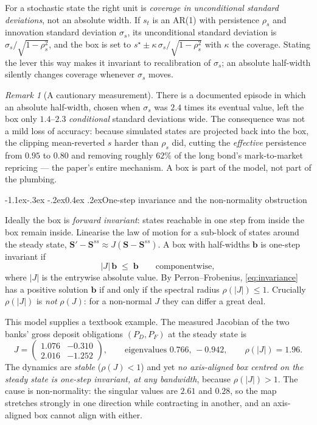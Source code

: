 \documentclass[10pt,a4paper]{article}
\makeatletter
\theoremstyle{definition}
\theoremstyle{plain}
\theoremstyle{remark}
\newtheorem{rem}[defn]{Remark}
\newcommand{\st}{\mathbf{S}}
\renewcommand\subsection{\@startsection{subsection}{2}{\z@}%
  {-1.1ex\@plus -.3ex \@minus -.2ex}{0.4ex \@plus .2ex}{\normalfont\normalsize\bfseries}}
\makeatother
\begin{document}
For a stochastic state the right unit is \emph{coverage in unconditional standard
deviations}, not an absolute width. If $s_t$ is an AR(1) with persistence $\rho_s$ and
innovation standard deviation $\sigma_s$, its unconditional standard deviation is
$\sigma_s/\sqrt{1-\rho_s^2}$, and the box is set to $s^\star \pm \kappa\,
\sigma_s/\sqrt{1-\rho_s^2}$ with $\kappa$ the coverage. Stating the lever this way makes it
invariant to recalibration of $\sigma_s$; an absolute half-width silently changes coverage
whenever $\sigma_s$ moves.

\begin{rem}[A cautionary measurement]
There is a documented episode in which an absolute half-width, chosen when $\sigma_s$ was
$2.4$ times its eventual value, left the box only $1.4$--$2.3$ \emph{conditional} standard
deviations wide. The consequence was not a mild loss of accuracy: because simulated states
are projected back into the box, the clipping mean-reverted $s$ harder than $\rho_s$ did,
cutting the \emph{effective} persistence from $0.95$ to $0.80$ and removing roughly $62\%$ of
the long bond's mark-to-market repricing --- the paper's entire mechanism. A box is part of
the model, not part of the plumbing.
\end{rem}

\subsection{One-step invariance and the non-normality obstruction}

Ideally the box is \emph{forward invariant}: states reachable in one step from inside the box
remain inside. Linearise the law of motion for a sub-block of states around the steady state,
$\st'-\st^{ss} \approx J(\st-\st^{ss})$. A box with half-widths $\bm{b}$ is one-step invariant
if
\begin{equation}
  |J|\,\bm{b} \;\le\; \bm{b} \qquad\text{componentwise},
  \label{eq:invariance}
\end{equation}
where $|J|$ is the entrywise absolute value. By Perron--Frobenius, \eqref{eq:invariance} has a
positive solution $\bm{b}$ if and only if the spectral radius $\rho(|J|)\le 1$. Crucially
$\rho(|J|)$ is \emph{not} $\rho(J)$: for a non-normal $J$ they can differ a great deal.

This model supplies a textbook example. The measured Jacobian of the two banks' gross deposit
obligations $(P_D,P_F)$ at the steady state is
\begin{equation}
  J = \begin{pmatrix} 1.076 & -0.310\\ 2.016 & -1.252\end{pmatrix},
  \qquad \text{eigenvalues } 0.766,\,-0.942,
  \qquad \rho(|J|) = 1.96 .
\end{equation}
The dynamics are \emph{stable} ($\rho(J)<1$) and yet \emph{no axis-aligned box centred on the
steady state is one-step invariant, at any bandwidth}, because $\rho(|J|)>1$. The cause is
non-normality: the singular values are $2.61$ and $0.28$, so the map stretches strongly in one
direction while contracting in another, and an axis-aligned box cannot align with either.
\end{document}
